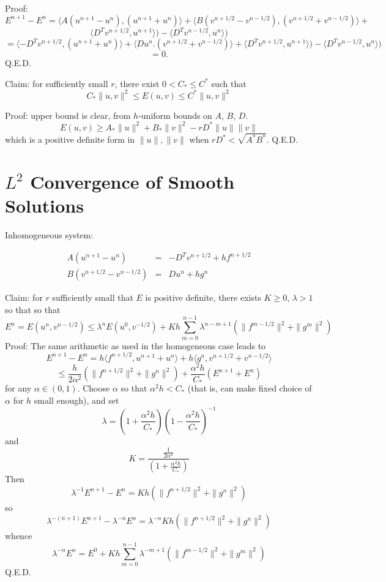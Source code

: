 Proof: 
\[
E^{n+1} - E^n =\langle A(u^{n+1}-u^n), (u^{n+1}+u^n)\rangle 
+ \langle B(v^{n+1/2}-v^{n-1/2}), (v^{n+1/2}+v^{n-1/2})\rangle +
\]
\[
\langle D^Tv^{n+1/2},u^{n+1}\rangle ) - \langle D^Tv^{n-1/2},u^n\rangle )
\]
\[
= \langle -D^Tv^{n+1/2},(u^{n+1}+u^n) \rangle 
+ \langle Du^n. (v^{n+1/2}+v^{n-1/2}) \rangle
+\langle D^Tv^{n+1/2},u^{n+1}\rangle ) - \langle D^Tv^{n-1/2},u^n\rangle )
\]
\[ 
=0.
\]
Q.E.D.

\noindent Claim: for sufficiently small $r$, there exist $0 < C_* \le C^*$ such that 
\begin{equation}
\label{eqn:pd}
C_*\|u,v\|^2 \le E(u,v) \le C^*\|u,v\|^2
\end{equation}

Proof: upper bound is clear, from $h$-uniform bounds on $A$, $B$,
$D$. 
\[
E(u,v) \ge A_*\|u\|^2 + B_*\|v\|^2 - rD^*\|u\|\|v\|
\]
which is a positive definite form in $\|u\|,\|v\|$ when $rD^* <
\sqrt{A^*B^*}$.
Q.E.D.

\section{$L^2$ Convergence of Smooth Solutions}
Inhomogeneous system:

\begin{eqnarray}
\label{eqn:in}
A(u^{n+1} - u^n) & = & -D^T v^{n+1/2} + hf^{n+1/2}\nonumber \\
B(v^{n+1/2}-v^{n-1/2}) & = & D u^n + h g^n
\end{eqnarray}

\noindent Claim: for $r$ sufficiently small that $E$ is positive definite, there
exists $K \ge 0$, $\lambda > 1$ so that so that
\[
E^n = E(u^n,v^{n-1/2}) \le \lambda^nE(u^0,v^{-1/2}) + Kh\sum_{m=0}^{n-1}\lambda^{n-m+1}(\|f^{m-1/2}\|^2 + \|g^m\|^2)
\]
Proof: The same arithmetic as used in the homogeneous case leads to
\[
E^{n+1}-E^n = h\langle f^{n+1/2}, u^{n+1}+u^n\rangle + h\langle g^n,
v^{n+1/2}+v^{n-1/2}\rangle
\]
\[
\le \frac{h}{2\alpha^2} (\|f^{n+1/2}\|^2 + \|g^n\|^2) +
\frac{\alpha^2h}{C_*}(E^{n+1}+E^n)
\]
for any $\alpha \in (0,1)$. Choose $\alpha$ so that $\alpha^2 h < C_*$
(that is, can make fixed choice of $\alpha$ for $h$ small enough), and
set 
\[
\lambda = \left(1+\frac{\alpha^2h}{C_*}\right) \left(1-\frac{\alpha^2h}{C_*}\right)^{-1}
\]
and 
\[
K = \frac{\frac{1}{2\alpha^2}}{ \left(1+\frac{\alpha^2h}{C_*}\right) }
\]
Then
\[
\lambda^{-1}E^{n+1} - E^n = Kh (\|f^{n+1/2}\|^2 + \|g^n\|^2)  
\] 
so 
\[
\lambda^{-(n+1)}E^{n+1} - \lambda^{-n}E^n = \lambda^{-n}Kh (\|f^{n+1/2}\|^2 + \|g^n\|^2) 
\]
whence
\[
\lambda^{-n}E^n = E^0 +
Kh\sum_{m=0}^{n-1}\lambda^{-m+1}(\|f^{m-1/2}\|^2 + \|g^m\|^2)
\]
Q.E.D.

